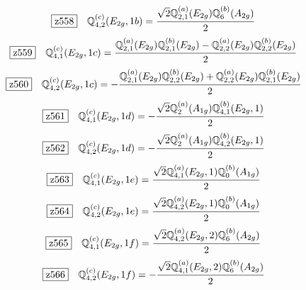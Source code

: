 \documentclass[fleqn,10pt,landscape]{jsarticle}
\begin{document}
\begin{dmath*}
\hspace*{3mm}\fbox{z558}\quad \mathbb{Q}_{4,2}^{(c)}(E_{2g},1b)=\frac{\sqrt{2} \mathbb{Q}_{2,1}^{(a)}(E_{2g}) \mathbb{Q}_{6}^{(b)}(A_{2g})}{2}
\end{dmath*}
\begin{dmath*}
\hspace*{3mm}\fbox{z559}\quad \mathbb{Q}_{4,1}^{(c)}(E_{2g},1c)=\frac{\mathbb{Q}_{2,1}^{(a)}(E_{2g}) \mathbb{Q}_{2,1}^{(b)}(E_{2g}) - \mathbb{Q}_{2,2}^{(a)}(E_{2g}) \mathbb{Q}_{2,2}^{(b)}(E_{2g})}{2}
\end{dmath*}
\begin{dmath*}
\hspace*{3mm}\fbox{z560}\quad \mathbb{Q}_{4,2}^{(c)}(E_{2g},1c)=- \frac{\mathbb{Q}_{2,1}^{(a)}(E_{2g}) \mathbb{Q}_{2,2}^{(b)}(E_{2g}) + \mathbb{Q}_{2,2}^{(a)}(E_{2g}) \mathbb{Q}_{2,1}^{(b)}(E_{2g})}{2}
\end{dmath*}
\begin{dmath*}
\hspace*{3mm}\fbox{z561}\quad \mathbb{Q}_{4,1}^{(c)}(E_{2g},1d)=- \frac{\sqrt{2} \mathbb{Q}_{2}^{(a)}(A_{1g}) \mathbb{Q}_{4,1}^{(b)}(E_{2g},1)}{2}
\end{dmath*}
\begin{dmath*}
\hspace*{3mm}\fbox{z562}\quad \mathbb{Q}_{4,2}^{(c)}(E_{2g},1d)=- \frac{\sqrt{2} \mathbb{Q}_{2}^{(a)}(A_{1g}) \mathbb{Q}_{4,2}^{(b)}(E_{2g},1)}{2}
\end{dmath*}
\begin{dmath*}
\hspace*{3mm}\fbox{z563}\quad \mathbb{Q}_{4,1}^{(c)}(E_{2g},1e)=\frac{\sqrt{2} \mathbb{Q}_{4,1}^{(a)}(E_{2g},1) \mathbb{Q}_{0}^{(b)}(A_{1g})}{2}
\end{dmath*}
\begin{dmath*}
\hspace*{3mm}\fbox{z564}\quad \mathbb{Q}_{4,2}^{(c)}(E_{2g},1e)=\frac{\sqrt{2} \mathbb{Q}_{4,2}^{(a)}(E_{2g},1) \mathbb{Q}_{0}^{(b)}(A_{1g})}{2}
\end{dmath*}
\begin{dmath*}
\hspace*{3mm}\fbox{z565}\quad \mathbb{Q}_{4,1}^{(c)}(E_{2g},1f)=\frac{\sqrt{2} \mathbb{Q}_{4,2}^{(a)}(E_{2g},2) \mathbb{Q}_{6}^{(b)}(A_{2g})}{2}
\end{dmath*}
\begin{dmath*}
\hspace*{3mm}\fbox{z566}\quad \mathbb{Q}_{4,2}^{(c)}(E_{2g},1f)=- \frac{\sqrt{2} \mathbb{Q}_{4,1}^{(a)}(E_{2g},2) \mathbb{Q}_{6}^{(b)}(A_{2g})}{2}
\end{dmath*}
\end{document}
